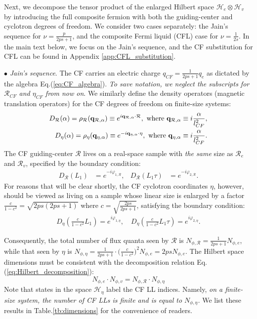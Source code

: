 Next, we decompose the tensor product of the enlarged Hilbert space $\mathcal H_e\otimes \mathcal H_v$ by introducing the full composite fermion with both the guiding-center and cyclotron degrees of freedom. We consider two cases separately: the Jain's sequence for $\nu=\frac{p}{2ps+1}$, and the composite Fermi liquid (CFL) case for $\nu=\frac{1}{2s}$. In the main text below, we focus on the Jain's sequence, and the CF substitution for CFL can be found in Appendix \ref{app:CFL_substitution}.

$\bullet$ \emph{Jain's sequence}.
The CF carries an electric charge $q_{CF}=\frac{1}{2ps+1} q_e$ as dictated by the algebra Eq.(\ref{eq:CF_algebra}). \emph{To save notation, we neglect the subscripts for $\mathcal R_{CF}$ and $\eta_{CF}$ from now on}. We similarly define the density operators (magnetic translation operators) for the CF degrees of freedom on finite-size systems:
\begin{align}
D_{\mathcal R}(\alpha)=\rho_{\mathcal R}(\mathbf q_{\mathcal R,\alpha}) \equiv e^{i\mathbf q_{\mathcal R,\alpha}\cdot \mathcal R},\text{ where }\mathbf q_{\mathcal R,\alpha}\equiv i\frac{\alpha}{l_{CF}^2},\notag\\
D_{\eta}(\alpha)=\rho_{\eta}(\mathbf q_{\eta,\alpha}) \equiv e^{-i\mathbf q_{\eta,\alpha}\cdot \eta},\text{ where }\mathbf q_{\eta,\alpha}\equiv i\frac{\alpha}{l_{CF}^2}.\label{eq:D_R_D_eta}
\end{align}
The CF guiding-center $\mathcal R$ lives on a real-space sample with \emph{the same} size as $\mathcal R_e$ and $\mathcal R_v$, specified by the boundary condition:
\begin{align}
D_{\mathcal R}(L_1)&=e^{-i\varphi_{1,\mathcal R}},&D_{\mathcal R}(L_1\tau)&=e^{-i\varphi_{2,\mathcal R}}.
\end{align}
For reasons that will be clear shortly, the CF cyclotron coordinates $\eta$, however, should be viewed as living on a sample whose linear size is enlarged by a factor $\frac{c}{1-c^2}=\sqrt{2ps(2ps+1)}$ where $c=\sqrt{\frac{2ps}{2ps+1}}$, satisfying the boundary condition:
\begin{align}
D_{\eta}\left(\frac{c}{1-c^2}L_1\right)=e^{i\varphi_{1,\eta}},\quad D_{\eta}\left(\frac{c}{1-c^2}L_1\tau\right)=e^{i\varphi_{2,\eta}}.
\end{align}

Consequently, the total number of flux quanta seen by $\mathcal R$ is $N_{\phi,\mathcal R}=\frac{1}{2ps+1} N_{\phi,e}$, while that seen by $\eta$ is $N_{\phi,\eta}=\frac{1}{2ps+1}\cdot\big(\frac{c}{1-c^2}\big)^2 N_{\phi,e}=2psN_{\phi,e}$. The Hilbert space dimensions must be consistent with the decomposition relation Eq.(\ref{eq:Hilbert_decomposition}): 
\begin{equation}
N_{\phi,e}\cdot N_{\phi,v}=N_{\phi,\mathcal R}\cdot N_{\phi,\eta}    
\end{equation}
Note that states in the space $\mathcal H_{\eta}$ label the CF LL indices. Namely, \emph{on a finite-size system, the number of CF LLs is finite and is equal to $N_{\phi,\eta}$.} We list these results in Table.\ref{tb:dimensions} for the convenience of readers. 

